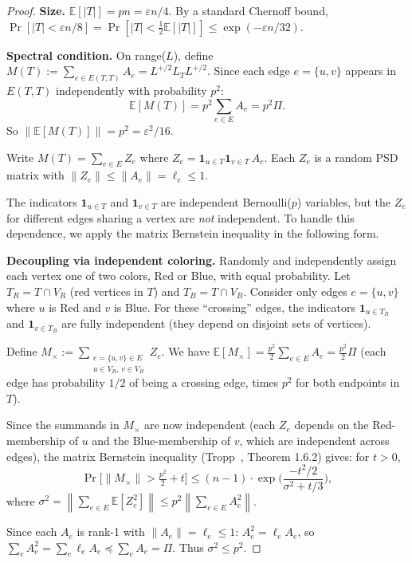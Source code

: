 \begin{proof}
\textbf{Size.}
$\mathbb{E}[|T|] = pn = \varepsilon n / 4$.  By a standard Chernoff bound,
$\Pr[|T| < \varepsilon n / 8] = \Pr[|T| < \tfrac{1}{2}\mathbb{E}[|T|]]
\leq \exp(-\varepsilon n / 32)$.

\textbf{Spectral condition.}
On range($L$), define $M(T) := \sum_{e \in E(T,T)} A_e = L^{+/2} L_T L^{+/2}$.
Since each edge $e = \{u,v\}$ appears in $E(T,T)$ independently with
probability $p^2$:
\[
  \mathbb{E}[M(T)] = p^2 \sum_{e \in E} A_e = p^2 \Pi.
\]
So $\|\mathbb{E}[M(T)]\| = p^2 = \varepsilon^2/16$.

Write $M(T) = \sum_{e \in E} Z_e$ where
$Z_e = \mathbf{1}_{u \in T}\mathbf{1}_{v \in T}\, A_e$.  Each $Z_e$ is
a random PSD matrix with $\|Z_e\| \leq \|A_e\| = \ell_e \leq 1$.

The indicators $\mathbf{1}_{u \in T}$ and $\mathbf{1}_{v \in T}$ are
independent Bernoulli($p$) variables, but the $Z_e$ for different edges
sharing a vertex are \emph{not} independent.  To handle this dependence,
we apply the matrix Bernstein inequality in the following form.

\textbf{Decoupling via independent coloring.}
Randomly and independently assign each vertex one of two colors, Red or Blue,
with equal probability.  Let $T_R = T \cap V_R$ (red vertices in $T$) and
$T_B = T \cap V_B$.  Consider only edges $e = \{u,v\}$ where $u$ is Red and
$v$ is Blue.  For these ``crossing'' edges, the indicators
$\mathbf{1}_{u \in T_R}$ and $\mathbf{1}_{v \in T_B}$ are fully independent
(they depend on disjoint sets of vertices).

Define $M_{\times} := \sum_{\substack{e = \{u,v\} \in E \\ u \in V_R,\, v \in V_B}}
Z_e$.  We have $\mathbb{E}[M_{\times}] = \frac{p^2}{2} \sum_{e \in E} A_e
= \frac{p^2}{2} \Pi$ (each edge has probability $1/2$ of being a crossing edge,
times $p^2$ for both endpoints in $T$).

Since the summands in $M_{\times}$ are now independent (each $Z_e$ depends
on the Red-membership of $u$ and the Blue-membership of $v$, which are
independent across edges), the matrix Bernstein inequality
(Tropp~\cite{Tro12}, Theorem 1.6.2) gives: for $t > 0$,
\[
  \Pr\!\big[\|M_{\times}\| > \tfrac{p^2}{2} + t\big]
  \leq (n-1) \cdot \exp\!\Bigg(\frac{-t^2/2}{\sigma^2 + t/3}\Bigg),
\]
where $\sigma^2 = \left\|\sum_{e \in E} \mathbb{E}[Z_e^2]\right\|
\leq p^2 \left\|\sum_{e \in E} A_e^2\right\|$.

Since each $A_e$ is rank-1 with $\|A_e\| = \ell_e \leq 1$:
$A_e^2 = \ell_e A_e$, so
$\sum_e A_e^2 = \sum_e \ell_e A_e \preceq \sum_e A_e = \Pi$.
Thus $\sigma^2 \leq p^2$.


\end{proof}
